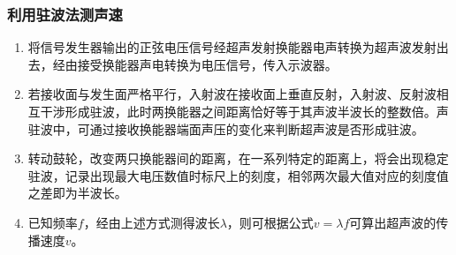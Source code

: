 \documentclass[UTF8]{article}
\theoremstyle{MyLineTheoremStyle} %
\theoremstyle{MyBlockTheoremStyle} %
\theoremstyle{MySubsubsectionStyle} %
\begin{document}
\subsubsection{利用驻波法测声速}
\begin{enumerate}
\item 将信号发生器输出的正弦电压信号经超声发射换能器电声转换为超声波发射出去，经由接受换能器声电转换为电压信号，传入示波器。
\item 若接收面与发生面严格平行，入射波在接收面上垂直反射，入射波、反射波相互干涉形成驻波，此时两换能器之间距离恰好等于其声波半波长的整数倍。声驻波中，可通过接收换能器端面声压的变化来判断超声波是否形成驻波。
\item 转动鼓轮，改变两只换能器间的距离，在一系列特定的距离上，将会出现稳定驻波，记录出现最大电压数值时标尺上的刻度，相邻两次最大值对应的刻度值之差即为半波长。
\item 已知频率$ f $，经由上述方式测得波长$ \lambda $，则可根据公式$ v=\lambda f $可算出超声波的传播速度$ v $。
\end{enumerate}
\end{document}
